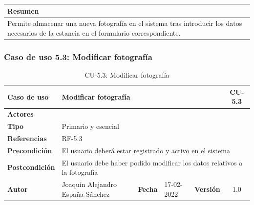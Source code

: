     \begin{table}[H]
        \centering
        \begin{tabularx}{\textwidth}{@{} |L |@{}} \hline
            \textbf{Resumen} \\
            \hline
            Permite almacenar una nueva fotografía en el sistema tras introducir los datos
            necesarios de la estancia en el formulario correspondiente.\\
            \hline
        \end{tabularx}
    \end{table}

\subsubsection{Caso de uso 5.3: Modificar fotografía}

    \begin{table}[H]
    \begin{center}
        \begin{adjustbox}{width=\textwidth}
        \begin{tabular}{ | l | l | l | l | c | c | } 
            \hline
            \textbf{Caso de uso} & \multicolumn{4}{l|}{Modificar fotografía} & \cellcolor{gray!50} \textbf{CU-5.3}\\
            \hline
            \textbf{Actores} & \multicolumn{5}{p{0.9\linewidth}|}{ } \\
            \hline
            \textbf{Tipo} & \multicolumn{5}{l|}{Primario y esencial} \\
            \hline
            \textbf{Referencias} & \multicolumn{3}{l|}{RF-5.3} & \multicolumn{2}{l|}{ }\\
            \hline
            \textbf{Precondición} & \multicolumn{5}{l|}{El usuario deberá estar registrado y activo en el sistema} \\
            \hline
            \textbf{Postcondición} & \multicolumn{5}{l|}{El usuario debe haber podido modificar los datos relativos a la fotografía} \\
            \hline
            \textbf{Autor} & \multicolumn{1}{p{0.25\linewidth}|}{Joaquín Alejandro España Sánchez} & \textbf{Fecha} & 
            17-02-2022     & \textbf{Versión}                                                      & 1.0\\
            \hline
        \end{tabular}
        \end{adjustbox}
        \caption{CU-5.3: Modificar fotografía}
        \label{tab:modify-photo}
    \end{center}
    \end{table}

